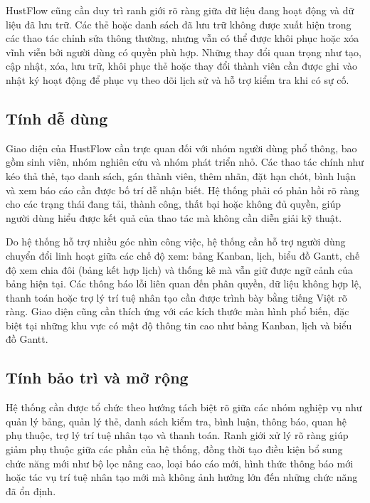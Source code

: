 \documentclass[../DoAn.tex]{subfiles}
\begin{document}
HustFlow cũng cần duy trì ranh giới rõ ràng giữa dữ liệu đang hoạt động và dữ liệu đã lưu trữ. Các thẻ hoặc danh sách đã lưu trữ không được xuất hiện trong các thao tác chỉnh sửa thông thường, nhưng vẫn có thể được khôi phục hoặc xóa vĩnh viễn bởi người dùng có quyền phù hợp. Những thay đổi quan trọng như tạo, cập nhật, xóa, lưu trữ, khôi phục thẻ hoặc thay đổi thành viên cần được ghi vào nhật ký hoạt động để phục vụ theo dõi lịch sử và hỗ trợ kiểm tra khi có sự cố.

\subsection{Tính dễ dùng}
\label{subsection:2.4.4}

Giao diện của HustFlow cần trực quan đối với nhóm người dùng phổ thông, bao gồm sinh viên, nhóm nghiên cứu và nhóm phát triển nhỏ. Các thao tác chính như kéo thả thẻ, tạo danh sách, gán thành viên, thêm nhãn, đặt hạn chót, bình luận và xem báo cáo cần được bố trí dễ nhận biết. Hệ thống phải có phản hồi rõ ràng cho các trạng thái đang tải, thành công, thất bại hoặc không đủ quyền, giúp người dùng hiểu được kết quả của thao tác mà không cần diễn giải kỹ thuật.

Do hệ thống hỗ trợ nhiều góc nhìn công việc, hệ thống cần hỗ trợ người dùng chuyển đổi linh hoạt giữa các chế độ xem: bảng Kanban, lịch, biểu đồ Gantt, chế độ xem chia đôi (bảng kết hợp lịch) và thống kê mà vẫn giữ được ngữ cảnh của bảng hiện tại. Các thông báo lỗi liên quan đến phân quyền, dữ liệu không hợp lệ, thanh toán hoặc trợ lý trí tuệ nhân tạo cần được trình bày bằng tiếng Việt rõ ràng. Giao diện cũng cần thích ứng với các kích thước màn hình phổ biến, đặc biệt tại những khu vực có mật độ thông tin cao như bảng Kanban, lịch và biểu đồ Gantt.

\subsection{Tính bảo trì và mở rộng}
\label{subsection:2.4.5}

Hệ thống cần được tổ chức theo hướng tách biệt rõ giữa các nhóm nghiệp vụ như quản lý bảng, quản lý thẻ, danh sách kiểm tra, bình luận, thông báo, quan hệ phụ thuộc, trợ lý trí tuệ nhân tạo và thanh toán. Ranh giới xử lý rõ ràng giúp giảm phụ thuộc giữa các phần của hệ thống, đồng thời tạo điều kiện bổ sung chức năng mới như bộ lọc nâng cao, loại báo cáo mới, hình thức thông báo mới hoặc tác vụ trí tuệ nhân tạo mới mà không ảnh hưởng lớn đến những chức năng đã ổn định.
\end{document}
